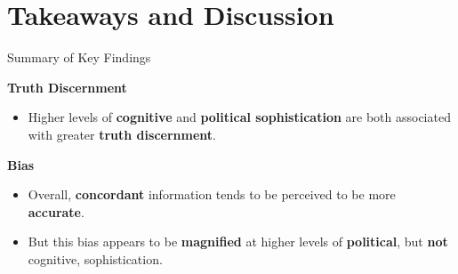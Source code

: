 \documentclass[10pt,table]{beamer}
\begin{document}
\section{Takeaways and Discussion}

\begin{frame}[t,fragile, label = key_findings]{Summary of Key Findings}

\setlength{\leftmargini}{15pt}
\setlength{\rightmargini}{10pt}
\vspace{0.25em}

\textbf{Truth Discernment} \vspace{0.25em}
\begin{itemize}
\item Higher levels of \alert{\bf cognitive} and \alert{\bf political sophistication} are both associated with greater \alert{\bf truth discernment}.  
\end{itemize}
\bigskip \pause

\textbf{Bias} \vspace{0.25em}
\begin{itemize}
\item Overall, \alert{\bf concordant} information tends to be perceived to be more \alert{\bf accurate}. 
\bigskip \pause

\item But this bias appears to be \alert{\bf magnified} at higher levels of \alert{\bf political}, but \alert{\bf not} cognitive, sophistication.
\end{itemize}





\end{frame}
\end{document}
